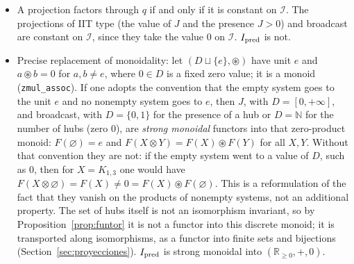 \begin{theorem}\label{thm:collapse}
\begin{itemize}
\item[(a)] A projection factors through $q$ if and only if it is constant on $\mathcal I$. The projections of IIT type (the value of $J$ and the presence $J>0$) and broadcast are constant on $\mathcal I$, since they take the value $0$ on $\mathcal I$. $I_{\rm pred}$ is not.
\item[(b)] Precise replacement of monoidality: let $(D\sqcup\{e\},\circledast)$ have unit $e$ and $a\circledast b=0$ for $a,b\ne e$, where $0\in D$ is a fixed zero value; it is a monoid (\texttt{zmul\_assoc}). If one adopts the convention that the empty system goes to the unit $e$ and no nonempty system goes to $e$, then $J$, with $D=[0,+\infty]$, and broadcast, with $D=\{0,1\}$ for the presence of a hub or $D=\mathbb N$ for the number of hubs (zero $0$), are \emph{strong monoidal} functors into that zero-product monoid: $F(\varnothing)=e$ and $F(X\otimes Y)=F(X)\circledast F(Y)$ for all $X,Y$. Without that convention they are not: if the empty system went to a value of $D$, such as $0$, then for $X=K_{1,3}$ one would have $F(X\otimes\varnothing)=F(X)\ne0=F(X)\circledast F(\varnothing)$. This is a reformulation of the fact that they vanish on the products of nonempty systems, not an additional property. The set of hubs itself is not an isomorphism invariant, so by Proposition~\ref{prop:funtor} it is not a functor into this discrete monoid; it is transported along isomorphisms, as a functor into finite sets and bijections (Section~\ref{sec:proyecciones}). $I_{\rm pred}$ is strong monoidal into $(\mathbb R_{\ge0},+,0)$.
\end{itemize}
\end{theorem}
